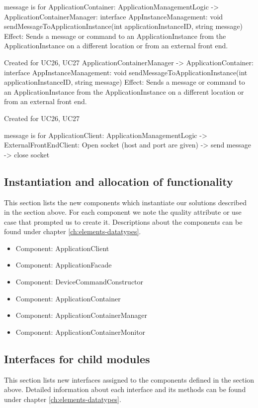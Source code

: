                 message is for ApplicationContainer:
                    ApplicationManagementLogic -> ApplicationContainerManager: interface AppInstanceManagement: void sendMessageToApplicationInstance(int applicationInstanceID, string message)
                        Effect: Sends a message or command to an ApplicationInstance from the ApplicationInstance on a different location or from an external front end.
                        \item Created for UC26, UC27
                    ApplicationContainerManager -> ApplicationContainer: interface AppInstanceManagement: void sendMessageToApplicationInstance(int applicationInstanceID, string message)
                        Effect: Sends a message or command to an ApplicationInstance from the ApplicationInstance on a different location or from an external front end.
                        \item Created for UC26, UC27

                message is for ApplicationClient:
                    ApplicationManagementLogic -> ExternalFrontEndClient: Open socket (host and port are given) -> send message -> close socket

\subsection{Instantiation and allocation of functionality}
    This section lists the new components which instantiate our solutions
    described in the section above. For each component we note the quality
    attribute or use case that prompted us to create it. Descriptions about
    the components can be found under chapter \ref{ch:elements-datatypes}. \\

    \begin{itemize}
        \item Component: ApplicationClient
        \item Component: ApplicationFacade
        \item Component: DeviceCommandConstructor
        \item Component: ApplicationContainer
        \item Component: ApplicationContainerManager
        \item Component: ApplicationContainerMonitor
    \end{itemize}


\subsection{Interfaces for child modules}
    This section lists new interfaces assigned to the components defined
    in the section above. Detailed information about each interface and
    its methods can be found under chapter \ref{ch:elements-datatypes}. \\

